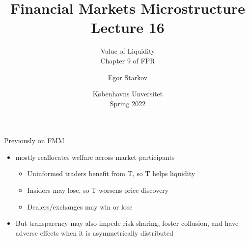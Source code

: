 \documentclass[english,10pt
,aspectratio=169
]{beamer}
\title{Financial Markets Microstructure \\ Lecture 16}
\subtitle{Value of Liquidity\\
	Chapter 9 of FPR}
\author{Egor Starkov}
\date{K{\o}benhavns Unversitet \\
	Spring 2022}
\begin{document}
\frame[plain]{\titlepage}


\begin{frame}{Previously on FMM}
	\begin{itemize}
		\item {} mostly reallocates welfare across market participants 
		\begin{itemize}
			\item Uninformed traders benefit from T, so T {helps liquidity}
			\item Insiders may lose, so T {worsens price discovery}
			\item Dealers/exchanges may win or lose
		\end{itemize}
		\item But transparency may also impede risk sharing, foster collusion, and have adverse effects when it is asymmetrically distributed
	\end{itemize}
\end{frame}
\end{document}
